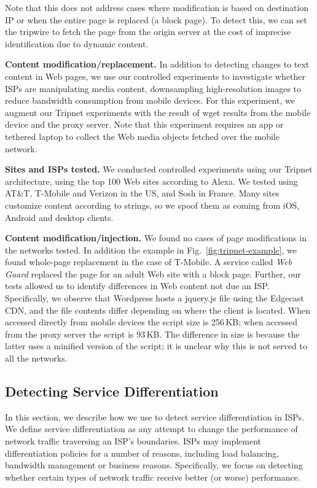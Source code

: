 Note that this does not address cases 
where modification is based on destination IP or when the entire page is replaced (\eg a block page). 
To detect this, we can set the tripwire to fetch the page from the origin server at the cost of imprecise 
identification due to dynamic content.  

\noindent\textbf{Content modification/replacement.}
In addition to detecting changes to text content in 
Web pages, we use our controlled experiments to investigate whether ISPs are manipulating 
media content, \eg downsampling high-resolution images to reduce bandwidth consumption 
from mobile devices. For this experiment, we augment our Tripnet experiments with the result 
of wget results from the mobile device and the proxy server. Note that this experiment requires an 
app or tethered laptop to collect the Web media objects fetched over the mobile network.

\noindent\textbf{Sites and ISPs tested.} We conducted controlled experiments using our Tripnet 
architecture, using the top 100 Web sites according to Alexa. We tested using 
AT\&T, T-Mobile and Verizon in the US, and Sosh in France. 
Many sites customize content according to \useragent strings, so we spoof them  
as coming from iOS, Android and desktop clients.



\noindent\textbf{Content modification/injection.} We found no cases of page modifications in 
the networks tested. In addition the example in Fig.~\ref{fig:tripnet-example}, we found whole-page replacement in the case of T-Mobile. A 
service called \emph{Web Guard} replaced the page for an adult Web site with a block page. 
Further, our tests allowed us to identify differences in Web content not due an ISP. Specifically, 
we observe that Wordpress hosts a jquery.js file using the Edgecast CDN, and the file contents 
differ depending on where the client is located. When accessed directly from mobile devices the 
script size is 256\,KB; when accessed from the proxy server the script is 93\,KB. The difference in 
size is because the latter uses a minified version of the script; it is unclear why this is not served 
to all the networks.

\subsection{Detecting Service Differentiation}

In this section, we describe how we use \meddle to detect service differentiation 
in ISPs. 
%
We define service differentiation as any attempt to change the performance 
of network traffic traversing an ISP's boundaries. ISPs may implement differentiation policies 
for a number of reasons, including load balancing, bandwidth management or business reasons. 
Specifically, we focus on detecting whether certain types of network traffic receive 
better (or worse) performance. 

